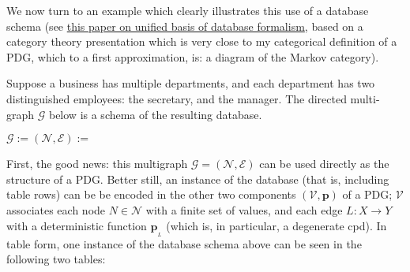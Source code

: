 \documentclass{article}
\theoremstyle{plain}
\theoremstyle{definition}
\theoremstyle{remark}
\newcommand\mat[1]{\mathbf{#1}}
\newcommand{\bp}[1][L]{\mat{p}_{\!_{#1}\!}}
\newcommand{\V}{\mathcal V}
\newcommand{\N}{\mathcal N}
\newcommand{\Ed}{\mathcal E}
\begin{document}
	We now turn to an example which clearly illustrates this use of a database schema (see \href{http://math.mit.edu/~dspivak/informatics/notes/unorganized/CTDB--spivakCurino.pdf}{this paper on unified basis of database formalism}, based on a category theory presentation which is very close to my categorical definition of a PDG, which to a first approximation, is: a diagram of the Markov category).
	
	\begin{example} \label{ex:dpt-emp}
		Suppose a business has multiple departments, and each department has two distinguished employees: the secretary, and the manager. 
		The directed multi-graph $\mathcal G$ below is a schema of the resulting database.
		\begin{center}
			$\mathcal G := (\N, \Ed) :=\qquad$
			\smallskip
		\end{center}
	
		First, the good news: this multigraph $\mathcal G = (\N, \Ed)$ can be used directly as the structure of a PDG. Better still, an instance of the database (that is, including table rows) can be be encoded in the other two components $(\V, \mat p)$ of a PDG; $\V$ associates each node $N \in \N$ with a finite set of values, and each edge $L: X \to Y$ with a deterministic function $\bp$ (which is, in particular, a degenerate cpd). In table form, one instance of the database schema above can be seen in the following two tables:
		

\end{example}
\end{document}
